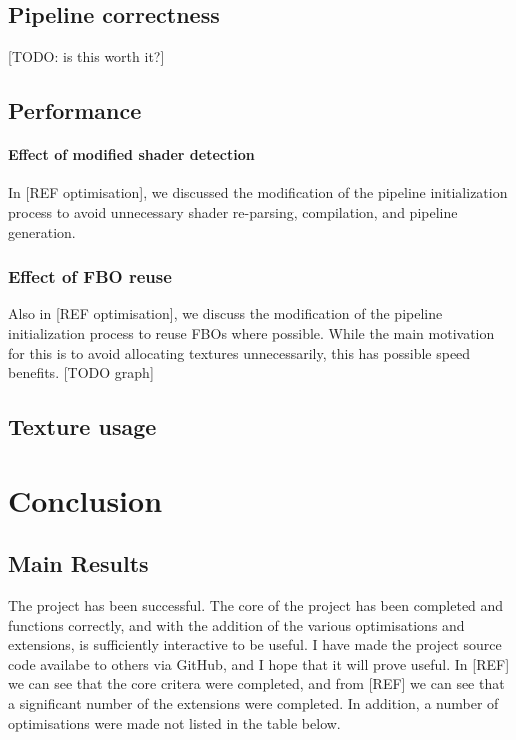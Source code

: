 \documentclass[12pt,twoside,notitlepage]{report}
\begin{document}

\section{Pipeline correctness}
[TODO: is this worth it?]

\section{Performance}
\subsubsection{Effect of modified shader detection}
In [REF optimisation], we discussed the modification of the pipeline initialization process to avoid unnecessary shader re-parsing, compilation, and pipeline generation. 

\subsection{Effect of FBO reuse}
Also in [REF optimisation], we discuss the modification of the pipeline initialization process to reuse FBOs where possible. While the main motivation for this is to avoid allocating textures unnecessarily, this has possible speed benefits. [TODO graph]

\section{Texture usage}

\cleardoublepage
\chapter{Conclusion}

\section{Main Results}
The project has been successful. The core of the project has been completed and functions correctly, and with the addition of the various optimisations and extensions, is sufficiently interactive to be useful. I have made the project source code availabe to others via GitHub, and I hope that it will prove useful. In [REF] we can see that the core critera were completed, and from [REF] we can see that a significant number of the extensions were completed. In addition, a number of optimisations were made not listed in the table below.
\end{document}
